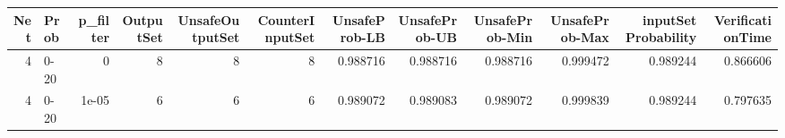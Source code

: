 \begin{tabular}{rlrrrrrrrrrr}
\hline
   Net & Prob   &   p\_filter &   OutputSet &   UnsafeOutputSet &   CounterInputSet &   UnsafeProb-LB &   UnsafeProb-UB &   UnsafeProb-Min &   UnsafeProb-Max &   inputSet Probability &   VerificationTime \\
\hline
     4 & 0-20   &      0     &           8 &                 8 &                 8 &        0.988716 &        0.988716 &         0.988716 &         0.999472 &               0.989244 &           0.866606 \\
     4 & 0-20   &      1e-05 &           6 &                 6 &                 6 &        0.989072 &        0.989083 &         0.989072 &         0.999839 &               0.989244 &           0.797635 \\
\hline
\end{tabular}
